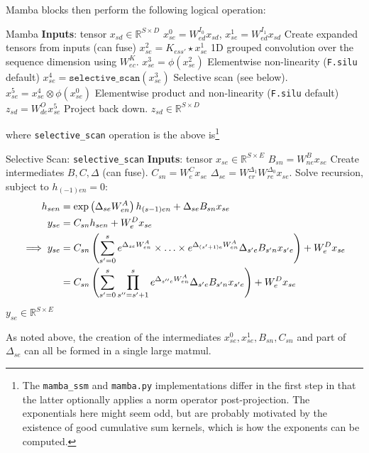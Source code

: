 \documentclass[11pt]{article}
\begin{document}
Mamba blocks then perform the following logical operation:
\begin{algo}{Mamba}
\State \textbf{Inputs}: tensor $ x _{ sd }\in \mathbb{R}^{ S\times D } $
\State $ x ^{ 0 } _{ se } = W ^{ I _{ 0 } }_{ ed } x _{ sd }$, $ x ^{ 1 }  _{ se } = W ^{ I _{ 1 } }_{ ed } x _{ sd } $ \Comment Create expanded tensors from inputs (can fuse)
\State $ x ^{ 2 } _{ se } = K _{ ess' }\star x ^{ 1 }_{ se }$ \Comment 1D grouped convolution over the sequence dimension using $ W ^{ K }_{ ec } $.
\State $ x ^{ 3 } _{ se } = \phi \left ( x ^{ 2 }_{ se } \right )$ \Comment Elementwise non-linearity (\texttt{F.silu} default)
\State $ x ^{ 4 } _{ se } = \texttt{selective\_scan} \left ( x ^{ 3 }_{ se } \right )$ \Comment Selective scan (see below).
\State $ x ^{ 5 } _{ se } = x ^{ 4 } _{ se }\otimes\phi \left ( x ^{ 0 }_{ se } \right )$ \Comment Elementwise product and non-linearity (\texttt{F.silu} default)
\State $ z _{ sd } = W ^{ O }_{ de }x ^{ 5 }_{ se }$ \Comment Project back down.
\State \Return $ z _{ sd } \in \mathbb{R}^{ S\times D }$
\label{algo_mamba_1}
\end{algo}

where \texttt{selective\_scan} operation is the above is\footnote{The \texttt{mamba\_ssm} and
\texttt{mamba.py} implementations differ in the first step in that the latter optionally applies a
norm operator post-projection. The exponentials here might seem odd, but are probably motivated by
the existence of good cumulative sum kernels, which is how the exponents can be computed.}

\begin{algo}{Selective Scan: \texttt{selective\_scan} }
\State \textbf{Inputs}: tensor $ x _{ se }\in \mathbb{R}^{ S\times E } $
\State $ B _{ sn } = W ^{ B }_{ ne }x _{ se } $  \Comment Create intermediates $B, C, \Delta  $ (can
fuse).
\State $ C _{ sn } = W ^{ C }_{ e }x _{ se } $
\State $ \Delta  _{ se } = W ^{ \Delta  _{ 1 } }_{ er } W ^{ \Delta _{ 0 } } _{ re } x _{ se } $.
\State Solve recursion, subject to $ h _{ (-1)en }=0 $:
\begin{align}
    h _{ sen } &= \exp \left ( \Delta  _{ se } W^{A} _{ en } \right ) h _{ (s-1)e n} + \Delta _{ se }B _{ sn }x _{ se }\nonumber\\
    y _{ se } &= C _{ sn }h _{ sen } + W ^{ D } _{ e }x _{ se } \nonumber\\
    \implies y _{ se } &= C _{ sn }\left (\sum _{ s'=0 }^{ s }e^{ \Delta _{ se }W^{A} _{ en } }\times \ldots \times e^{ \Delta _{ (s'+1)e }W^{A} _{ en } } \Delta _{ s'e } B _{ s'n } x _{ s'e }\right ) + W ^{ D } _{ e } x _{ se }\nonumber\\
     &= C _{ sn }\left (\sum _{ s'=0 }^{ s }\prod_{ s''=s'+1 }^{ s }e^{ \Delta _{ s''e }W^{A} _{ en } } \Delta _{ s'e } B _{ s'n } x _{ s'e }\right ) + W ^{ D } _{ e } x _{ se }
\end{align}
\State \Return $ y _{ se } \in \mathbb{R}^{ S\times E }$
\label{algo_mamba1_scan}
\end{algo}
As noted above, the creation of the intermediates $ x ^{ 0 }_{ se }, x ^{ 1 }_{ se }, B _{ sn }, C
_{ sn } $ and part of $ \Delta  _{ se } $ can all be formed in a single large matmul.
\end{document}
